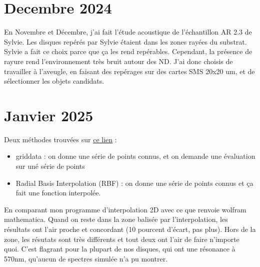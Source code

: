 \documentclass{article}
\newenvironment{ImportantBiblio}[1]{%
    \tcolorbox[beamer,%
    noparskip,breakable,
    colback=BgBiblio,colframe=BgTitleBiblio,%
    colbacklower=red!75!green,%
    title=#1]}%
    {\endtcolorbox}
\newenvironment{EtudeExp}[1]{%
    \tcolorbox[beamer,%
    noparskip,breakable,
    colback=BgEtude,colframe=BgTitleEtude,%
    colbacklower=red!75!green,%
    title=#1]}%
    {\endtcolorbox}
\begin{document}
\section*{Decembre 2024}

\begin{EtudeExp}{Influence de la longueur d'onde de sonde pour l'étude acoustique}

    En Novembre et Décembre, j'ai fait l'étude acoustique de l'échantillon AR 2.3 de Sylvie.
    Les disques repérés par Sylvie étaient dans les zones rayées du substrat. Sylvie a fait ce choix parce que ça les rend repérables. Cependant, la présence de rayure rend l'environnement très bruit autour des ND. J'ai donc choisis de travailler à l'aveugle, en faisant des repérages sur des cartes SMS 20x20 um, et de sélectionner les objets candidats. 
    
    
\end{EtudeExp}





\section*{Janvier 2025}
\begin{ImportantBiblio}{Interpolation AR sur Python}


    Deux méthodes trouvées sur \href{https://stackoverflow.com/questions/37872171/how-can-i-perform-two-dimensional-interpolation-using-scipy}{ce lien} : \begin{itemize}
        \item griddata : on donne une série de points connus, et on demande une évaluation sur uné série de points
        \item Radial Basis Interpolation (RBF) : on donne une série de points connus et ça fait une fonction interpolée. 
    \end{itemize}

    En comparant mon programme d'interpolation 2D avec ce que renvoie wolfram mathematica. Quand on reste dans la zone balisée par l'interpolation, les résultats ont l'air proche et concordant (10 pourcent d'écart, pas plus). Hors de la zone, les résutats sont très différents et tout deux ont l'air de faire n'importe quoi. C'est flagrant pour la plupart de nos disques, qui ont une résonance à 570nm, qu'aucun de spectres simulée n'a pu montrer.



\end{ImportantBiblio}
\end{document}
